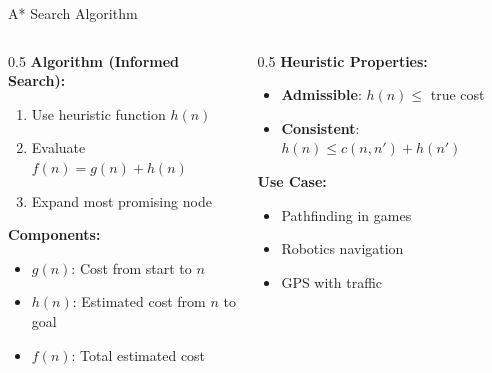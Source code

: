 \documentclass[aspectratio=169,xcolor=dvipsnames]{beamer}
\begin{document}
\begin{frame}{A* Search Algorithm}
  \begin{columns}
    \begin{column}{0.5\textwidth}
      \textbf{Algorithm (Informed Search):}
      \begin{enumerate}
        \item Use heuristic function $h(n)$
        \item Evaluate $f(n) = g(n) + h(n)$
        \item Expand most promising node
      \end{enumerate}

      \vspace{0.3cm}
      \textbf{Components:}
      \begin{itemize}
        \item $g(n)$: Cost from start to $n$
        \item $h(n)$: Estimated cost from $n$ to goal
        \item $f(n)$: Total estimated cost
      \end{itemize}
    \end{column}

    \begin{column}{0.5\textwidth}
      \textbf{Heuristic Properties:}
      \begin{itemize}
        \item \textbf{Admissible}: $h(n) \le$ true cost
        \item \textbf{Consistent}: $h(n) \le c(n,n') + h(n')$
      \end{itemize}

      \vspace{0.3cm}
      \textbf{Use Case:}
      \begin{itemize}
        \item Pathfinding in games
        \item Robotics navigation
        \item GPS with traffic
      \end{itemize}
    \end{column}
  \end{columns}
\end{frame}
\end{document}

